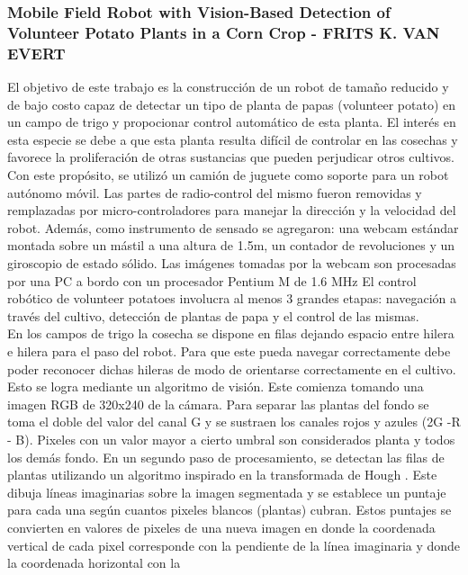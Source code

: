 	\subsubsection{\label{volunteer}Mobile Field Robot with Vision-Based Detection of Volunteer Potato Plants in a Corn Crop - FRITS K. VAN EVERT}
	El objetivo de este trabajo es la construcción de un robot de 
	tamaño reducido y de bajo costo capaz de detectar un tipo de 
	planta de papas (volunteer potato) en un campo de trigo y propocionar control automático de esta planta. El interés en 
	esta especie se debe a que esta planta resulta difícil de controlar en las cosechas y favorece la 
	proliferación de otras sustancias que pueden perjudicar otros 
	cultivos. Con este propósito, se utilizó un camión de juguete como 
	soporte para un robot autónomo móvil. Las partes de 
	radio-control del mismo fueron 
	removidas y remplazadas por micro-controladores para manejar la 
	dirección y la velocidad del robot. Además, como instrumento de 
	sensado se agregaron: una webcam estándar montada sobre un mástil a 
	una altura de 1.5m, un contador de revoluciones y un giroscopio de 
	estado sólido. Las imágenes tomadas por la webcam son procesadas 
	por una PC a bordo con un procesador Pentium M de 1.6 MHz El control robótico de volunteer potatoes involucra al 
	menos 3 grandes etapas: navegación a través del cultivo, detección 
	de plantas de papa y el control de las mismas.\\
	\indent En los campos de trigo la cosecha se dispone en filas 
	dejando espacio entre hilera e hilera para el paso del robot. Para 
	que este pueda navegar correctamente debe poder reconocer dichas 
	hileras de modo de orientarse correctamente en el cultivo. Esto se 
	logra mediante un algoritmo de visión. Este comienza 
	tomando una imagen RGB de 320x240 de la cámara. Para separar las 
	plantas del fondo se toma el doble del valor del canal G  y se 
	sustraen los canales rojos y azules (2G -R - B). Pixeles con un 
	valor mayor a cierto umbral son considerados planta y todos los 
	demás fondo. En un segundo paso de procesamiento, se detectan las 
	filas de plantas utilizando un algoritmo inspirado en la 
	transformada de Hough \cite{hough62}. Este dibuja líneas imaginarias sobre la 
	imagen segmentada y se establece un puntaje para cada una según 
	cuantos pixeles blancos (plantas) cubran. Estos puntajes se 
	convierten en valores de pixeles de una nueva imagen en donde la 
	coordenada vertical de cada pixel corresponde con la pendiente de 
	la línea imaginaria y donde la coordenada horizontal con la 
